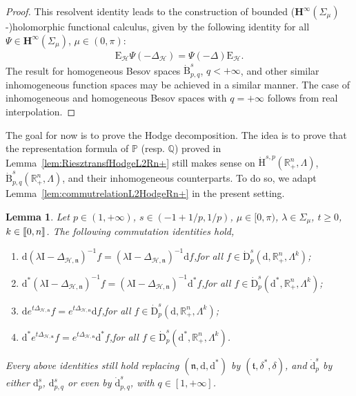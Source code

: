 \documentclass[10pt]{amsart}
\newtheorem{lemm}[theo]{Lemma}\newtheorem{prop}[theo]{Proposition}\newtheorem{coro}[theo]{Corollary}\newtheorem{conj}[theo]{Conjecture}
\theoremstyle{definition}\newtheorem{defi}[theo]{Definition}\newtheorem{rema}[theo]{Remark}\newtheorem{exam}[theo]{Example}\newtheorem{exem}[theo]{Example}\newtheorem{nota}[theo]{Notation}
\newcommand{\bbP}{\mathbb{P}}
\newcommand{\bbR}{\mathbb{R}}
\newcommand{\bbQ}{\mathbb{Q}}
\newcommand{\rmH}{\mathrm{H}}%
\newcommand{\rmB}{\mathrm{B}}
\newcommand{\rmd}{\mathrm{d}}
\newcommand{\rmD}{\mathrm{D}}
\newcommand{\rmE}{\mathrm{E}}
\newcommand{\rmI}{\mathrm{I}}
\newcommand{\clH}{\mathcal{H}}
\newcommand{\bfH}{\mathbf{H}}
\newcommand{\fkn}{\mathfrak{n}}
\newcommand{\fkt}{\mathfrak{t}}
\newcommand{\llbracket}{\mathopen{[\mkern -2.7mu[}}
\newcommand{\rrbracket}{\mathclose{]\mkern -2.7mu]}}
\newcommand{\llb}{\llbracket}
\newcommand{\rrb}{\rrbracket}
\begin{document}
\begin{proof}
This resolvent identity leads to the construction of bounded ($\bfH^\infty(\Sigma_\mu)$-)holomorphic functional calculus, given by the following identity for all $\Psi\in \bfH^{\infty}(\Sigma_\mu)$, $\mu\in(0,\pi)$:
\begin{align*}
\rmE _\clH\Psi(-\Delta_{\clH}) = \Psi(-\Delta)\rmE _\clH .
\end{align*}
The result for homogeneous Besov spaces $\dot{\rmB}^{s}_{p,q}$, $q<+\infty$, and other similar inhomogeneous function spaces may be achieved in a similar manner. The case of inhomogeneous and homogeneous Besov spaces with $q=+\infty$ follows from real interpolation.
\end{proof}

The goal for now is to prove the Hodge decomposition. The idea is to prove that the representation formula of $\bbP$ (resp. $\bbQ$) proved in Lemma~\ref{lem:RiesztransfHodgeL2Rn+} still makes sense on $\dot{\rmH}^{s,p}(\bbR^n_+,\Lambda)$, $\dot{\rmB}^{s}_{p,q}(\bbR^n_+,\Lambda)$, and their inhomogeneous counterparts. To do so, we adapt Lemma~\ref{lem:commutrelationL2HodgeRn+} in the present setting.


\begin{lemm}\label{lem:commutrelationHspBspqHodgeRn+}
Let $p\in(1,+\infty)$, $s\in(-1+1/p,1/p)$, $\mu\in[0,\pi)$, $\lambda\in\Sigma_\mu$, $t\geqslant0$, $k\in\llb 0,n\rrb$. The following commutation identities hold,
\begin{enumerate}
\item\label{lemm2.30.1} $\rmd(\lambda \rmI  - \Delta_{\clH,\fkn})^{-1}f = (\lambda \rmI  - \Delta_{\clH,\fkn})^{-1}\rmd f$,\quad for all $f\in\dot{\rmD}^s_{p}(\rmd,\bbR^n_+,\Lambda^k)$;
\item\label{lemm2.30.2} $\rmd^\ast(\lambda \rmI  - \Delta_{\clH,\fkn})^{-1}f = (\lambda \rmI  - \Delta_{\clH,\fkn})^{-1}\rmd^\ast f$,\quad for all $f\in\dot{\rmD}^s_{p}(\rmd^\ast,\bbR^n_+,\Lambda^k)$;
\item\label{lemm2.30.3} $\rmd e^{t\Delta_{\clH,\fkn}}f = e^{t\Delta_{\clH,\fkn}}\rmd f$,\quad for all $f\in\dot{\rmD}^s_{p}(\rmd,\bbR^n_+,\Lambda^k)$;
\item\label{lemm2.30.4} $\rmd^\ast e^{t\Delta_{\clH,\fkn}}f = e^{t\Delta_{\clH,\fkn}}\rmd^\ast f$,\quad for all $f\in\dot{\rmD}^s_{p}(\rmd^\ast,\bbR^n_+,\Lambda^k)$.
\end{enumerate}
Every above identities still hold replacing $(\fkn,\rmd,\rmd^\ast)$ by $(\fkt,\delta^\ast,\delta)$, and $\dot{\rmd}^s_{p}$ by either ${\rmd}^s_{p}$, ${\rmd}^s_{p,q}$ or even by $\dot{\rmd}^s_{p,q}$, with $q\in[1,+\infty]$.
\end{lemm}
\end{document}
